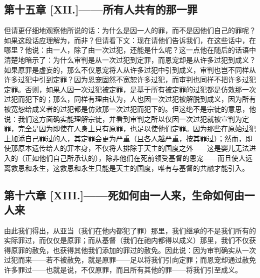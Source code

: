 
\subsection{第十五章 [XII.]——所有人共有的那一罪}

但请更仔细地观察他所说的话：为什么是因一人的罪，而不是因他们自己的罪呢？如果这段话应理解为，而非？但请看下文：现在请他们告诉我们，在这些话中，在哪里？他说：由一人，除了由一次过犯，还能是什么呢？这一点他在随后的话语中清楚地暗示了：为什么审判是从一次过犯到定罪，而恩宠却是从许多过犯到成义？如果原罪是虚妄的，那么不仅恩宠将人从许多过犯中引到成义，审判也岂不同样从许多过犯中引到定罪？因为恩宠固然不宽恕许多过犯，而审判也同样不把许多过犯定罪。否则，如果人因一次过犯被定罪，是基于所有被定罪的过犯都是仿效那一次过犯而犯下的；那么，同样有理由认为，人也因一次过犯被解脱到成义，因为所有被宽恕给成义者的过犯都是仿效那一次过犯而犯下的。但这绝不是宗徒的意思，他说：我们这方面确实能理解宗徒，并看到审判之所以仅因一次过犯就被宣判为定罪，完全是因为即使在人身上只有原罪，也足以使他们定罪。因为那些在原始过犯上加添自己罪过的人，其定罪会更为严重（且各人越严重，按其罪过）；然而，即使那原本遗传给人的罪本身，不仅将人排除于天主的国度之外——这是婴儿无法进入的（正如他们自己所承认的），除非他们在死前领受基督的恩宠——而且使人远离救恩和永生，这救恩和永生只能是天主的国度，唯有与基督的共融才能引入。\par


\subsection{第十六章 [XIII.]——死如何由一人来，生命如何由一人来}

由此我们得出，从亚当（我们在他内都犯了罪）那里，我们继承的不是我们所有的实际罪过，而仅仅是原罪；而从基督（我们在祂内都得以成义）那里，我们不仅获得原罪的赦免，也获得其他我们添加的罪过的赦免。因此说：因为审判确实从一次过犯而来——若不被赦免，就是原罪——足以将我们引向定罪；而恩宠却通过赦免许多罪过——也就是说，不仅原罪，而且所有其他的罪——将我们引至成义。\par

